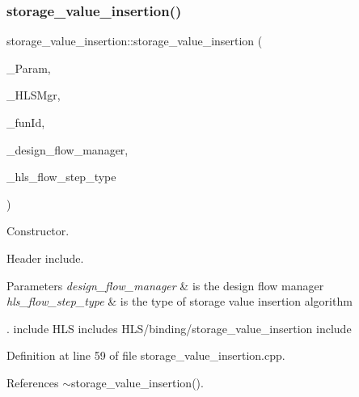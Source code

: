 \subsubsection{\texorpdfstring{storage\+\_\+value\+\_\+insertion()}{storage\_value\_insertion()}}
{\footnotesize\ttfamily storage\+\_\+value\+\_\+insertion\+::storage\+\_\+value\+\_\+insertion (\begin{DoxyParamCaption}\item[{const \hyperlink{Parameter_8hpp_a37841774a6fcb479b597fdf8955eb4ea}{Parameter\+Const\+Ref}}]{\+\_\+\+Param,  }\item[{const \hyperlink{hls__manager_8hpp_acd3842b8589fe52c08fc0b2fcc813bfe}{H\+L\+S\+\_\+manager\+Ref}}]{\+\_\+\+H\+L\+S\+Mgr,  }\item[{unsigned int}]{\+\_\+fun\+Id,  }\item[{const Design\+Flow\+Manager\+Const\+Ref}]{\+\_\+design\+\_\+flow\+\_\+manager,  }\item[{const \hyperlink{hls__step_8hpp_ada16bc22905016180e26fc7e39537f8d}{H\+L\+S\+Flow\+Step\+\_\+\+Type}}]{\+\_\+hls\+\_\+flow\+\_\+step\+\_\+type }\end{DoxyParamCaption})}



Constructor. 

Header include.


\begin{DoxyParams}{Parameters}
{\em design\+\_\+flow\+\_\+manager} & is the design flow manager \\
\hline
{\em hls\+\_\+flow\+\_\+step\+\_\+type} & is the type of storage value insertion algorithm\\
\hline
\end{DoxyParams}
. include H\+LS includes H\+L\+S/binding/storage\+\_\+value\+\_\+insertion include 

Definition at line 59 of file storage\+\_\+value\+\_\+insertion.\+cpp.



References $\sim$storage\+\_\+value\+\_\+insertion().

